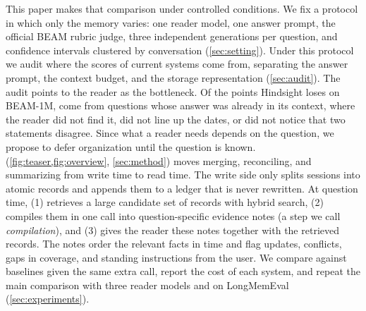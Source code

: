 This paper makes that comparison under controlled conditions. We fix a protocol in which only the memory varies:
one reader model, one answer prompt, the official BEAM rubric judge, three independent generations per question, and
confidence intervals clustered by conversation (\cref{sec:setting}). Under this protocol we audit where the scores of
current systems come from, separating the answer prompt, the context budget, and the storage representation
(\cref{sec:audit}). The audit points to the reader as the bottleneck. Of the  points Hindsight loses on
BEAM-1M,  come from questions whose answer was already in its context, where the reader did not find
it, did not line up the dates, or did not notice that two statements disagree. Since what a reader needs depends on
the question, we propose to defer organization until the question is known. \method{} (\cref{fig:teaser,fig:overview},
\cref{sec:method}) moves merging, reconciling, and summarizing from write time to read time. The write side only
splits sessions into atomic records and appends them to a ledger that is never rewritten. At question time,
\method{} (1) retrieves a large candidate set of records with hybrid search, (2) compiles them in one call into
question-specific evidence notes (a step we call \emph{compilation}), and (3) gives the reader these notes together with the retrieved records. The
notes order the relevant facts in time and flag updates, conflicts, gaps in coverage, and standing instructions from
the user. We compare against baselines given the same extra call, report the cost of each system, and repeat the main
comparison with three reader models and on LongMemEval~\citep{wu2025longmemeval} (\cref{sec:experiments}).

